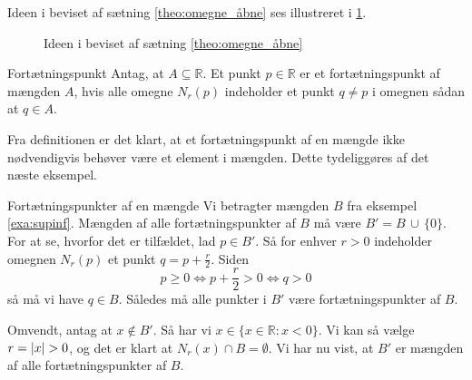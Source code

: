 Ideen i beviset af sætning \ref{theo:omegne_åbne} ses illustreret i \cref{fig:omegne_åbne}.

\begin{figure}[H]
\begin{center}
\end{center}
  \caption{Ideen i beviset af sætning \ref{theo:omegne_åbne}}
\label{fig:omegne_åbne}
\end{figure}

\begin{definition}[label=def:fortætningspunkt]{Fortætningspunkt}{}
  Antag, at $A \subseteq \mathbb{R}$.
  Et punkt $p \in \mathbb{R}$ er et fortætningspunkt af mængden $A$, hvis alle omegne $N_r(p)$ indeholder et punkt $q \neq p$ i omegnen sådan at $q \in A$. 
\end{definition}

Fra definitionen er det klart, at et fortætningspunkt af en mængde ikke nødvendigvis behøver være et element i mængden.
Dette tydeliggøres af det næste eksempel.

\begin{example}[label=exa:fortætningspunkter]{Fortætningspunkter af en mængde}{}
  Vi betragter mængden $B$ fra eksempel \ref{exa:supinf}. 
  Mængden af alle fortætningspunkter af $B$ må være $B'=B\, \cup\, \{ 0 \} $. 
For at se, hvorfor det er tilfældet, lad $p \in B'$.
  Så for enhver $r>0$ indeholder omegnen $N_r(p)$ et punkt $q=p+\frac{r}{2}$.
  Siden 
  \[
  p \geq 0 \iff p + \frac{r}{2} > 0 \iff q>0
  \] 
  så må vi have $q \in B$.
  Således må alle punkter i $B'$ være fortætningspunkter af $B$. 

  Omvendt, antag at $x \not\in B'$.
  Så har vi $x \in \{ x \in \mathbb{R}: x < 0 \} $.
  Vi kan så vælge $r=\abs{x} >0$, og det er klart at $N_r(x) \cap B = \emptyset$.
  Vi har nu vist, at $B'$ er mængden af alle fortætningspunkter af $B$.
\end{example}

